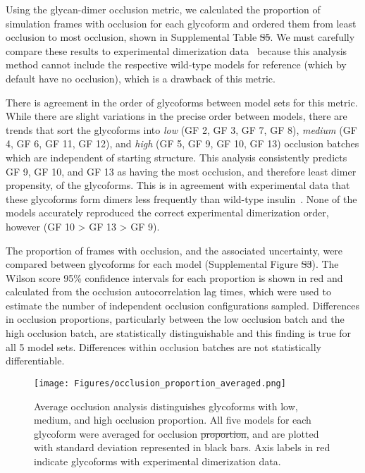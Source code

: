 \documentclass[9pt]{elife}
\providecommand{\DIFaddtex}[1]{{\protect\color{blue}\uwave{#1}}} %
\providecommand{\DIFdeltex}[1]{{\protect\color{red}\sout{#1}}}                      %
\providecommand{\DIFaddbegin}{} %
\providecommand{\DIFaddend}{} %
\providecommand{\DIFdelbegin}{} %
\providecommand{\DIFdelend}{} %
\providecommand{\DIFaddFL}[1]{\DIFadd{#1}} %
\providecommand{\DIFdelFL}[1]{\DIFdel{#1}} %
\providecommand{\DIFaddbeginFL}{} %
\providecommand{\DIFaddendFL}{} %
\providecommand{\DIFdelbeginFL}{} %
\providecommand{\DIFdelendFL}{} %
\providecommand{\DIFadd}[1]{\texorpdfstring{\DIFaddtex{#1}}{#1}} %
\providecommand{\DIFdel}[1]{\texorpdfstring{\DIFdeltex{#1}}{}} %
\begin{document}
Using the glycan-dimer occlusion metric, we calculated the proportion of simulation frames with occlusion for each glycoform and ordered them from least occlusion to most occlusion, shown in Supplemental Table \DIFdelbegin \DIFdel{S5}\DIFdelend \DIFaddbegin \DIFadd{S7}\DIFaddend . We must carefully compare these results to experimental dimerization data~\cite{guan2018chemically} because this analysis method cannot include the respective wild-type models for reference (which by default have no occlusion), which is a drawback of this metric.

There is \DIFaddbegin \DIFadd{an }\DIFaddend agreement in the order of glycoforms between model sets for this metric. While there are slight variations in the precise order between models, there are trends that sort the glycoforms into \emph{low} (GF 2, GF 3, GF 7, GF 8), \emph{medium} (GF 4, GF 6, GF 11, GF 12), and \emph{high} (GF 5, GF 9, GF 10, GF 13) occlusion batches which are independent of starting structure. This analysis consistently predicts GF 9, GF 10, and GF 13 as having the most occlusion, and therefore least dimer propensity, of the glycoforms. This is in agreement with experimental data that these glycoforms form dimers less frequently than wild-type insulin~\cite{guan2018chemically}. None of the models accurately reproduced the correct experimental dimerization order, however (GF 10 > GF 13 > GF 9).

The proportion of frames with occlusion, and the associated uncertainty, were compared between glycoforms for each model (Supplemental Figure \DIFdelbegin \DIFdel{S3}\DIFdelend \DIFaddbegin \DIFadd{S7}\DIFaddend ). The Wilson score 95\% confidence intervals for each proportion is shown in red and calculated from the occlusion autocorrelation lag times, which were used to estimate the number of independent occlusion configurations sampled. Differences in occlusion proportions, particularly between the low occlusion batch and the high occlusion batch, are statistically distinguishable and this finding is true for all 5 model sets. Differences within occlusion batches are not statistically differentiable.

\begin{figure}[H]
\centering
\texttt{[image: Figures/occlusion\_proportion\_averaged.png]}
\caption{Average occlusion analysis distinguishes glycoforms with low, medium, and high occlusion proportion. All five models for each glycoform were averaged for occlusion \DIFdelbeginFL \DIFdelFL{proportion}\DIFdelendFL \DIFaddbeginFL \DIFaddFL{proportions}\DIFaddendFL , and are plotted with standard deviation represented in black bars. Axis labels in red indicate glycoforms with experimental dimerization data.}
\label{occlusion_results}
\end{figure}
\end{document}
